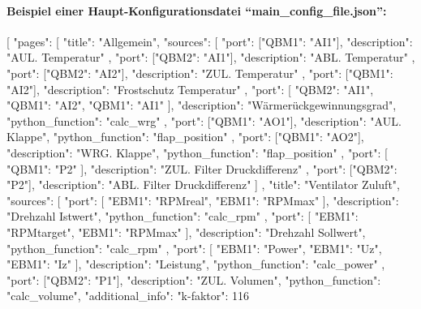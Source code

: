 \paragraph{Beispiel einer Haupt-Konfigurationsdatei \enquote{main\_config\_file.json}:}
\begin{jsoncode}
[
  {
    "pages": [
      {
        "title": "Allgemein",
        "sources": [
          {
            "port": [{"QBM1": "AI1"}],
            "description": "AUL. Temperatur"
          },
          {
            "port": [{"QBM2": "AI1"}],
            "description": "ABL. Temperatur"
          },
          {
            "port": [{"QBM2": "AI2"}],
            "description": "ZUL. Temperatur"
          },
          {
            "port": [{"QBM1": "AI2"}],
            "description": "Frostschutz Temperatur"
          },
          {
            "port": [
              {"QBM2": "AI1"},
              {"QBM1": "AI2"},
              {"QBM1": "AI1"}
            ],
            "description": "Wärmerückgewinnungsgrad",
            "python_function": "calc_wrg"
          },
          {
            "port": [{"QBM1": "AO1"}],
            "description": "AUL. Klappe",
            "python_function": "flap_position"
          },
          {
            "port": [{"QBM1": "AO2"}],
            "description": "WRG. Klappe",
            "python_function": "flap_position"
          },
          {
            "port": [
              {"QBM1": "P2"}
            ],
            "description": "ZUL. Filter Druckdifferenz"
          },
          {
            "port": [{"QBM2": "P2"}],
            "description": "ABL. Filter Druckdifferenz"
          }
        ]
      },
      {
        "title": "Ventilator Zuluft",
        "sources": [
          {
            "port": [
              {"EBM1": "RPMreal"},
              {"EBM1": "RPMmax"}
            ],
            "description": "Drehzahl Istwert",
            "python_function": "calc_rpm"
          },
          {
            "port": [
              {"EBM1": "RPMtarget"},
              {"EBM1": "RPMmax"}
            ],
            "description": "Drehzahl Sollwert",
            "python_function": "calc_rpm"
          },
          {
            "port": [
              {"EBM1": "Power"},
              {"EBM1": "Uz"},
              {"EBM1": "Iz"}
            ],
            "description": "Leistung",
            "python_function": "calc_power"
          },
          {
            "port": [{"QBM2": "P1"}],
            "description": "ZUL. Volumen",
            "python_function": "calc_volume",
            "additional_info": {"k-faktor": 116}
}}}
\end{jsoncode}
